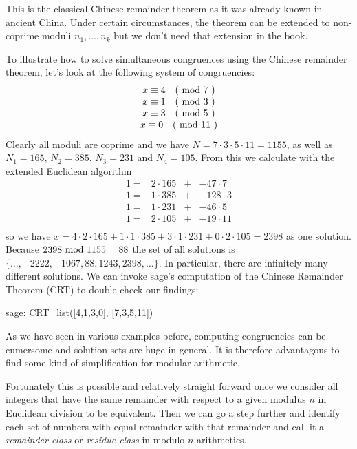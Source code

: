 This is the classical Chinese remainder theorem as it was already known in ancient China. Under certain circumstances, the theorem can be extended to non-coprime moduli $ n_1, \ldots, n_k $ but we don't need that extension in the book.
\begin{example} To illustrate how to solve simultaneous congruences using the Chinese remainder theorem, let's look at the following system of congruencies:
$$
\begin{array}{c}
x \equiv 4 \quad \text{( mod } 7 \text{ )} \\
x \equiv 1 \quad \text{( mod } 3 \text{ )} \\
x \equiv 3 \quad \text{( mod } 5 \text{ )} \\
x \equiv 0 \quad \text{( mod } 11 \text{ )} \\
\end{array}
$$
Clearly all moduli are coprime and we have $ N = 7 \cdot 3 \cdot 5 \cdot 11 = 1155 $, as well as
$ N_1 = 165 $, $ N_2 = 385 $, $ N_3 = 231 $ and $ N_4 = 105 $. From this we calculate with the extended Euclidean algorithm
$$
\begin{array}{cccc}
 1 = & 2 \cdot 165  & + & -47 \cdot 7 \\
 1 = & 1 \cdot 385  & + &  -128 \cdot 3 \\
 1 = & 1 \cdot 231  & + &  -46 \cdot 5 \\
 1 = & 2 \cdot 105  & + &  -19 \cdot 11 \\
\end{array}
$$
so we have
$x = 4 \cdot 2 \cdot 165 + 1 \cdot 1 \cdot 385 + 3 \cdot 1 \cdot 231 + 0 \cdot 2 \cdot 105 = 2398$
as one solution. Because $ 2398 \text{ mod } 1155 = 88 $ the set of all solutions is
$ \{\ldots, -2222, -1067,88,1243, 2398, \ldots \} $. In particular, there are infinitely many different solutions. We can invoke sage's computation of the Chinese Remainder Theorem (CRT) to double check our findings:
\begin{sagecommandline}
sage: CRT_list([4,1,3,0], [7,3,5,11])
\end{sagecommandline}
\end{example}
As we have seen in various examples before, computing congruencies can be cumersome and solution sets are huge in general. It is therefore advantagous to find some kind of simplification for modular arithmetic. 

Fortunately this is possible and relatively straight forward once we consider all integers that have the same remainder with respect to a given modulus $n$ in Euclidean division to be equivalent. Then we can go a step further and identify each set of numbers with equal remainder with that remainder and call it a \textit{remainder class} or \textit{residue class} in modulo $n$ arithmetics. 

